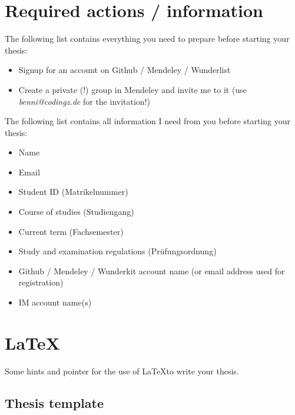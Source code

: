 \documentclass{article}
\begin{document}
\section{Required actions / information}

The following list contains everything you need to prepare before starting your thesis:

\begin{itemize}
	\item Signup for an account on Github / Mendeley / Wunderlist
	\item Create a private (!) group in Mendeley and invite me to it (use \emph{benni@codingz.de} for the invitation!)
\end{itemize}

The following list contains all information I need from you before starting your thesis:

\begin{itemize}
	\item Name
	\item Email
	\item Student ID (Matrikelnummer)
	\item Course of studies (Studiengang)
	\item Current term (Fachsemester)
	\item Study and examination regulations (Pr\"{u}fungsordnung)
	\item Github / Mendeley / Wunderkit account name (or email address used for registration)
	\item IM account name(s)
\end{itemize}










\appendix







\section{\LaTeX}

Some hints and pointer for the use of \LaTeX to write your thesis.

\subsection{Thesis template}
\end{document}
